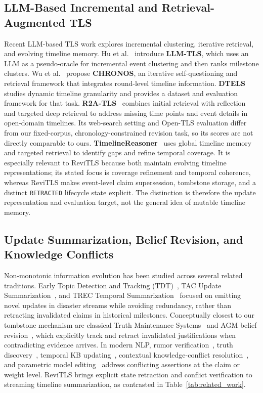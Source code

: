 \documentclass[journal]{IEEEtran}
\begin{document}
\subsection{LLM-Based Incremental and Retrieval-Augmented TLS}
Recent LLM-based TLS work explores incremental clustering, iterative retrieval, and evolving timeline memory. Hu et al.~\cite{hu2024moments} introduce \textbf{LLM-TLS}, which uses an LLM as a pseudo-oracle for incremental event clustering and then ranks milestone clusters. Wu et al.~\cite{wu2025unfolding} propose \textbf{CHRONOS}, an iterative self-questioning and retrieval framework that integrates round-level timeline information. \textbf{DTELS}~\cite{dtels2025} studies dynamic timeline granularity and provides a dataset and evaluation framework for that task. \textbf{R2A-TLS}~\cite{bao2025r2atls} combines initial retrieval with reflection and targeted deep retrieval to address missing time points and event details in open-domain timelines. Its web-search setting and Open-TLS evaluation differ from our fixed-corpus, chronology-constrained revision task, so its scores are not directly comparable to ours. \textbf{TimelineReasoner}~\cite{zhang2026timelinereasoner} uses global timeline memory and targeted retrieval to identify gaps and refine temporal coverage. It is especially relevant to ReviTLS because both maintain evolving timeline representations; its stated focus is coverage refinement and temporal coherence, whereas ReviTLS makes event-level claim supersession, tombstone storage, and a distinct \texttt{RETRACTED} lifecycle state explicit. The distinction is therefore the update representation and evaluation target, not the general idea of mutable timeline memory.

\subsection{Update Summarization, Belief Revision, and Knowledge Conflicts}
Non-monotonic information evolution has been studied across several related traditions. Early Topic Detection and Tracking (TDT)~\cite{allan2002topic}, TAC Update Summarization~\cite{dang2008overview}, and TREC Temporal Summarization~\cite{aslam2013trec, kedzie2015predicting} focused on emitting novel updates in disaster streams while avoiding redundancy, rather than retracting invalidated claims in historical milestones. Conceptually closest to our tombstone mechanism are classical Truth Maintenance Systems~\cite{doyle1979truth} and AGM belief revision~\cite{alchourron1985logic}, which explicitly track and retract invalidated justifications when contradicting evidence arrives. In modern NLP, rumor verification~\cite{zubiaga2016analysing, kochkina2018all, thorne2018fever}, truth discovery~\cite{li2016survey}, temporal KB updating~\cite{dhingra2022time, kasai2023realtime}, contextual knowledge-conflict resolution~\cite{xu2024knowledge}, and parametric model editing~\cite{meng2022locating, mitchell2022fast} address conflicting assertions at the claim or weight level. ReviTLS brings explicit state retraction and conflict verification to streaming timeline summarization, as contrasted in Table~\ref{tab:related_work}.
\end{document}
